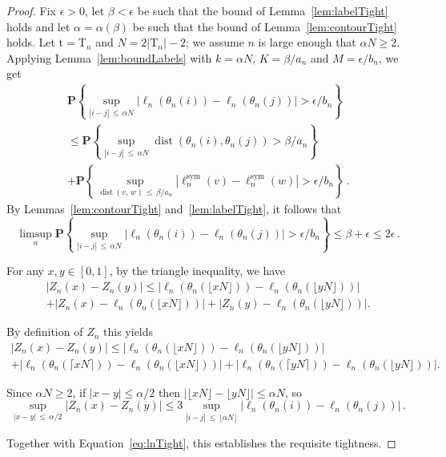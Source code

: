 \documentclass[AHL,Unicode,longabstracts,published]{cedram}
\newcommand{\rT}{\mathrm{T}}
\newcommand{\rt}{\mathrm{t}}
\DeclareMathOperator{\sym}{sym}
\DeclareMathOperator{\dist}{dist}
\newcommand{\p}[1]{\mathbf{P}\left\{#1\right\}}
\providecommand{\eps}{}
\renewcommand{\eps}{\epsilon}
\begin{document}
\begin{proof}
Fix $\epsilon>0$, let $\beta<\eps$ be such that the bound of Lemma~\ref{lem:labelTight} holds and let $\alpha = \alpha(\beta)$ be such that the bound of Lemma~\ref{lem:contourTight} holds. Let $\rt=\rT_n$ and $N=2|\rT_n|-2$; we assume $n$ is large enough that $\alpha N \ge 2$. Applying Lemma~\ref{lem:boundLabels} with $k=\alpha N$, $K= \beta/a_n$ and $M=\epsilon/b_n$, we get
\begin{multline*}
\p{\sup_{|i-j|\,\le\,\alpha N} \left|\ell_n(\theta_n(i)) -\ell_n(\theta_n(j))\right| > \epsilon/b_n}\\
\le
\p{\sup_{|i-j|\,\le\,\alpha N} \dist(\theta_n(i),\theta_n(j)) > \beta/a_n}\\
+\p{
\sup_{\dist(v,\,w)\,\le\,\beta/a_n} \left|\ell_n^{\sym}(v) - \ell_n^{\sym}(w)\right| > \epsilon/b_n}\,.
\end{multline*}
By Lemmas~\ref{lem:contourTight} and~\ref{lem:labelTight}, it follows that
\begin{equation}\label{eq:lnTight}
\limsup_n \p{\sup_{|i-j|\,\le\,\alpha N} \left|\ell_n(\theta_n(i)) -\ell_n(\theta_n(j))\right| > \epsilon/b_n} \le \beta + \epsilon \le 2\epsilon\,.
\end{equation}


For any $x,y \in [0,1]$, by the triangle inequality, we have
\begin{multline*}
\left|Z_n(x)-Z_n(y)\right| \le \left|\ell_n(\theta_n(\lfloor xN\rfloor))-\ell_n(\theta_n(\lfloor yN\rfloor))\right|\\
+\left|Z_n(x)-\ell_n(\theta_n(\lfloor xN\rfloor))\right|+\left|Z_n(y)-\ell_n(\theta_n(\lfloor yN\rfloor))\right|.
\end{multline*}


By definition of $Z_n$ this yields
\begin{multline*}
\left|Z_n(x)-Z_n(y)\right| \le \left|\ell_n(\theta_n(\lfloor xN\rfloor))-\ell_n(\theta_n(\lfloor yN\rfloor))\right|\\
+\left|\ell_n(\theta_n(\lceil xN\rceil))-\ell_n(\theta_n(\lfloor xN\rfloor))\right|+\left|\ell_n(\theta_n(\lceil yN\rceil))-\ell_n(\theta_n(\lfloor yN\rfloor))\right|.
\end{multline*}


Since $\alpha N \ge 2$, if $|x-y| \le \alpha/2$ then $|\lfloor x N \rfloor - \lfloor y N \rfloor| \le \alpha N$, so
\[
\sup_{|x-y|\,\le\,\alpha/2}\left|Z_n(x)-Z_n(y)\right| \le 3 \sup_{|i-j|\,\le\,\lfloor \alpha N\rfloor} \left|\ell_n(\theta_n(i)) -\ell_n(\theta_n(j))\right|\,.
\]

Together with Equation~\eqref{eq:lnTight}, this establishes the requisite tightness.
\end{proof}
\end{document}
